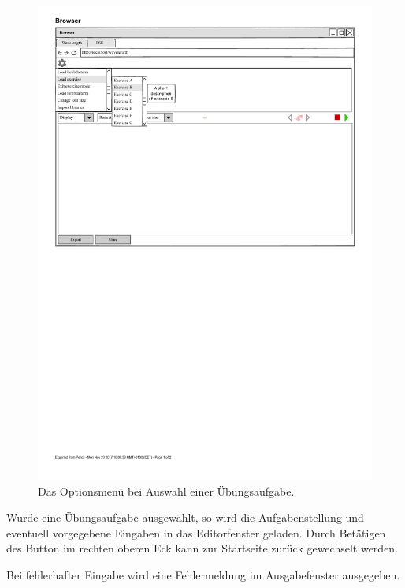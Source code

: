 \documentclass[parskip=full,11pt,twoside]{scrartcl}
\begin{document}
\begin{figure}[H]
	\centering
	\includegraphics[width=\textwidth]{img/wavelength_exercise_menu_open}
	\caption{Das Optionsmenü bei Auswahl einer Übungsaufgabe.}
\end{figure}

Wurde eine Übungsaufgabe ausgewählt, so wird die Aufgabenstellung und eventuell vorgegebene Eingaben in das Editorfenster geladen. Durch Betätigen des Button im rechten oberen Eck kann zur Startseite zurück gewechselt werden.

\begin{figure}[H]
	\centering
\end{figure}

Bei fehlerhafter Eingabe wird eine Fehlermeldung im Ausgabefenster ausgegeben.
\end{document}
